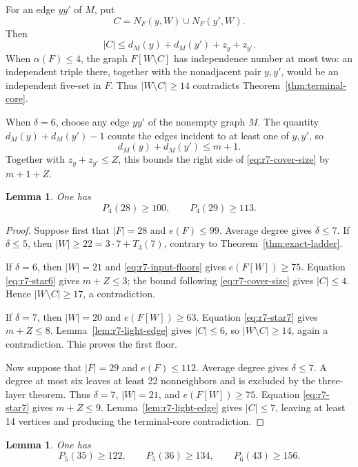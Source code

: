 \documentclass[11pt,reqno,a4paper]{amsart}
\newtheorem{lemma}[theorem]{Lemma}
\theoremstyle{definition}
\theoremstyle{remark}
\begin{document}
For an edge $yy'$ of $M$, put
\[
 C=N_F(y,W)\cup N_F(y',W).
\]
Then
\begin{equation}\label{eq:r7-cover-size}
 |C|\leq d_M(y)+d_M(y')+z_y+z_{y'}.
\end{equation}
When $\alpha(F)\leq4$, the graph $F[W\setminus C]$ has independence
number at most two: an independent triple there, together with the
nonadjacent pair $y,y'$, would be an independent five-set in $F$.
Thus $|W\setminus C|\geq14$ contradicts
Theorem~\ref{thm:terminal-core}.

When $\delta=6$, choose any edge $yy'$ of the nonempty graph $M$. The
quantity $d_M(y)+d_M(y')-1$ counts the edges incident to at least one of
$y,y'$, so
\[
 d_M(y)+d_M(y')\leq m+1.
\]
Together with $z_y+z_{y'}\leq Z$, this bounds the right side of
\eqref{eq:r7-cover-size} by $m+1+Z$.

\begin{lemma}\label{lem:r7-p4-floors}
One has
\[
  P_4(28)\geq100,
  \qquad P_4(29)\geq113.
\]
\end{lemma}

\begin{proof}
Suppose first that $|F|=28$ and $e(F)\leq99$. Average degree gives
$\delta\leq7$. If $\delta\leq5$, then $|W|\geq22=3\cdot7+T_3(7)$,
contrary to Theorem~\ref{thm:exact-ladder}.

If $\delta=6$, then $|W|=21$ and
\eqref{eq:r7-input-floors} gives $e(F[W])\geq75$. Equation
\eqref{eq:r7-star6} gives $m+Z\leq3$; the bound following
\eqref{eq:r7-cover-size} gives $|C|\leq4$. Hence
$|W\setminus C|\geq17$, a contradiction.

If $\delta=7$, then $|W|=20$ and
$e(F[W])\geq63$. Equation \eqref{eq:r7-star7} gives $m+Z\leq8$.
Lemma~\ref{lem:r7-light-edge} gives $|C|\leq6$, so
$|W\setminus C|\geq14$, again a contradiction. This proves the first
floor.

Now suppose that $|F|=29$ and $e(F)\leq112$. Average degree gives
$\delta\leq7$. A degree at most six leaves at least 22 nonneighbors and
is excluded by the three-layer theorem. Thus $\delta=7$, $|W|=21$,
and $e(F[W])\geq75$. Equation \eqref{eq:r7-star7} gives
$m+Z\leq9$. Lemma~\ref{lem:r7-light-edge} gives $|C|\leq7$, leaving
at least 14 vertices and producing the terminal-core contradiction.
\end{proof}

\begin{lemma}\label{lem:r7-propagation}
One has
\[
 P_5(35)\geq122,
 \qquad P_5(36)\geq134,
 \qquad P_6(43)\geq156.
\]
\end{lemma}
\end{document}
